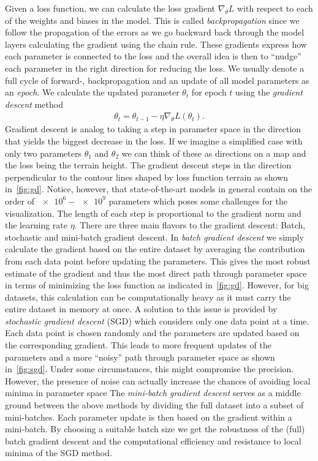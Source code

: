 Given a loss function, we can calculate the loss gradient $\nabla_\theta L$ with respect to each of the weights and biases in the model. This is called \textit{backpropagation} since we follow the propagation of the errors as we go backward back through the model layers calculating the gradient using the chain rule. These gradients express how each parameter is connected to the loss and the overall idea is then to ``nudge'' each parameter in the right direction for reducing the loss. We usually denote a full cycle of forward-, backpropagation and an update of all model parameters as an \textit{epoch}. We calculate the updated parameter $\theta_t$ for epoch $t$ using the \textit{gradient descent} method
\begin{align}
  \theta_{t} = \theta_{t-1} - \eta \nabla_\theta L(\theta_t).
  \label{eq:grad_descent}
\end{align}
Gradient descent is analog to taking a step in parameter space in the direction
that yields the biggest decrease in the loss. If we imagine a simplified case
with only two parameters $\theta_1$ and $\theta_2$ we can think of these as directions on a map and the loss being the terrain height. The gradient descent steps in the direction perpendicular to the contour lines shaped by loss function terrain as shown in~\cref{fig:gd}. Notice, however, that state-of-the-art models in general contain on the order of $\num{e6}-\num{e9}$ parameters \cite{thompson2022computational} which poses some challenges for the visualization.  The length of each step is proportional to the gradient norm and the learning rate $\eta$. There are three main flavors to the gradient descent: Batch,
stochastic and mini-batch gradient descent. In \textit{batch gradient descent} we simply
calculate the gradient based on the entire dataset by averaging the contribution
from each data point before updating the parameters. This gives the most robust estimate of the gradient and thus the most direct path through parameter space in terms of minimizing the loss function as
indicated in~\cref{fig:gd}. However, for big datasets, this calculation can be
computationally heavy as it must carry the entire dataset in memory at once. A
solution to this issue is provided by \textit{stochastic gradient descent}
(\acrshort{SGD}) which considers only one data point at a time. Each data point is chosen randomly and the parameters are updated based on the corresponding gradient. This leads to more frequent updates of the parameters and a more ``noisy'' path through parameter space as shown in~\cref{fig:sgd}.  Under some circumstances, this might compromise the precision. However, the presence of noise can actually increase the chances of avoiding local minima in parameter space The \textit{mini-batch gradient descent} serves as a middle ground between the above methods by dividing the full dataset into a subset of mini-batches. Each parameter update is then based on the gradient within a mini-batch. By choosing a suitable batch size we get the robustness of the (full) batch gradient descent and the computational efficiency and resistance to local minima of the \acrshort{SGD} method. 



